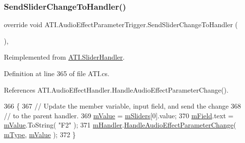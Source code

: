 \subsubsection{\texorpdfstring{Send\+Slider\+Change\+To\+Handler()}{SendSliderChangeToHandler()}}
{\footnotesize\ttfamily override void A\+T\+I.\+Audio\+Effect\+Parameter\+Trigger.\+Send\+Slider\+Change\+To\+Handler (\begin{DoxyParamCaption}{ }\end{DoxyParamCaption})\hspace{0.3cm}{\ttfamily [protected]}, {\ttfamily [virtual]}}



Reimplemented from \hyperlink{class_a_t_i_1_1_slider_handler_a51fd8e687677af70535a9332ded83d3b}{A\+T\+I.\+Slider\+Handler}.



Definition at line 365 of file A\+T\+I.\+cs.



References A\+T\+I.\+Audio\+Effect\+Handler.\+Handle\+Audio\+Effect\+Parameter\+Change().


\begin{DoxyCode}
366         \{
367             \textcolor{comment}{// Update the member variable, input field, and send the change }
368             \textcolor{comment}{// to the parent handler.}
369             \hyperlink{class_a_t_i_1_1_audio_effect_parameter_trigger_ad123c432e1decb6410707940ab7383e6}{mValue} = \hyperlink{class_a_t_i_1_1_slider_handler_a038a487fbd701cb786e77c210830be76}{mSliders}[0].value;
370             \hyperlink{class_a_t_i_1_1_audio_effect_parameter_trigger_af2d8e3ab407c8e1eb216fd67976ac0c8}{mField}.text = \hyperlink{class_a_t_i_1_1_audio_effect_parameter_trigger_ad123c432e1decb6410707940ab7383e6}{mValue}.ToString( \textcolor{stringliteral}{"F2"} );
371             \hyperlink{class_a_t_i_1_1_audio_effect_parameter_trigger_adbbf64af845654ab7737b081b232b456}{mHandler}.\hyperlink{class_a_t_i_1_1_audio_effect_handler_a298f455be06ae16a870fa291337a77c6}{HandleAudioEffectParameterChange}( 
      \hyperlink{class_a_t_i_1_1_audio_effect_parameter_trigger_ac2ca110ecb26468c2c9fde094a1e5bd7}{mType}, \hyperlink{class_a_t_i_1_1_audio_effect_parameter_trigger_ad123c432e1decb6410707940ab7383e6}{mValue} );
372         \}
\end{DoxyCode}
\mbox{\label{class_a_t_i_1_1_audio_effect_parameter_trigger_a69dc7845ba6454981ce5454ca55b4cb1}} 
